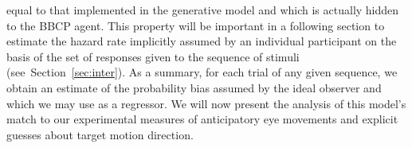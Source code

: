 \documentclass[12pt,english]{article}%
\newcommand{\seeFig}[1]{Figure~\ref{fig:#1}}
\newcommand{\seeSec}[1]{Section~\ref{sec:#1}}
\newcommand{\AM}[1]{\textbf{\textcolor{blue}{[AM: #1]}}}
\begin{document}
equal to that implemented in the generative model and which is actually hidden to the BBCP agent.
This property will be important in a following section 
to estimate the hazard rate implicitly assumed by an individual participant
on the basis of the set of responses given to the  sequence of stimuli
(see~\seeSec{inter}).
%
As a summary, for each trial of any given sequence,
we obtain an estimate of the probability bias assumed by the ideal observer
and which we may use as a regressor.
We will now present the analysis of this model's match 
to our experimental measures of anticipatory eye movements and 
explicit guesses about target motion direction.
\end{document}
